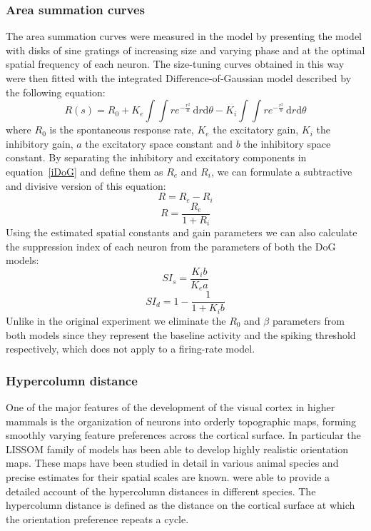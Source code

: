 \subsubsection{Area summation curves} \label{DoG_Section}

The area summation curves were measured in the model by presenting the
model with disks of sine gratings of increasing size and varying phase
and at the optimal spatial frequency of each neuron. The size-tuning
curves obtained in this way were then fitted with the integrated
Difference-of-Gaussian model described by the following equation:
\begin{equation}
R(s) = R_0 + K_e \int \int re^{-\frac{r^2}{a}} \,
\mathrm{d}r\mathrm{d}\theta - K_i \int\int re^{-\frac{r^2}{b}} \,
\mathrm{d}r\mathrm{d}\theta
\label{iDoG}
\end{equation}
\noindent where $R_0$ is the spontaneous response rate, $K_e$ the
excitatory gain, $K_i$ the inhibitory gain, $a$ the excitatory space
constant and $b$ the inhibitory space constant. By separating the
inhibitory and excitatory components in equation~\ref{iDoG} and define
them as $R_e$ and $R_i$, we can formulate a subtractive and divisive
version of this equation:
\begin{equation}
R = R_e - R_i
\label{DoGSubstractive}
\end{equation}
\begin{equation}
R = \frac{R_e}{1+R_i}
\label{DoGDivisive}
\end{equation}
Using the estimated spatial constants and gain parameters we can also
calculate the suppression index of each neuron from the parameters of
both the DoG models:
\begin{equation}
  SI_s = \frac{K_i b}{K_e a}
\end{equation}
\begin{equation}
  SI_d = 1 - \frac{1}{1+K_i b}
\end{equation}
Unlike in the original experiment we eliminate the $R_0$ and $\beta$
parameters from both models since they represent the baseline activity
and the spiking threshold respectively, which does not apply to a
firing-rate model.

\subsubsection{Hypercolumn distance}

One of the major features of the development of the visual cortex in
higher mammals is the organization of neurons into orderly topographic
maps, forming smoothly varying feature preferences across the cortical
surface. In particular the LISSOM family of models has been able to
develop highly realistic orientation maps. These maps have been
studied in detail in various animal species and precise estimates for
their spatial scales are known. \cite{Kaschube2010} were able to
provide a detailed account of the hypercolumn distances in different
species. The hypercolumn distance is defined as the distance on the
cortical surface at which the orientation preference repeats a cycle.


